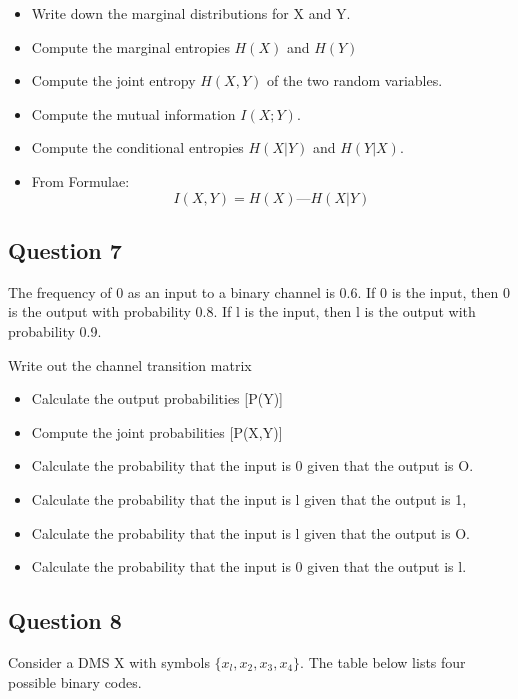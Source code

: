 \documentclass[a4paper,12pt]{article}
\begin{document}
\begin{itemize}
\item Write down the marginal distributions for X and Y. %
\item Compute the marginal entropies $H(X)$ and $H(Y)$ %
\item Compute the joint entropy $H(X,Y)$ of the two random variables. %
\item
Compute the mutual information $I(X;Y)$.
\item 
Compute the conditional entropies $H(X|Y)$ and $H(Y|X)$.
\item 
From Formulae: \[I(X,Y) = H(X) — H(X|Y)\]
\end{itemize}
\subsection*{Question 7}

The frequency of 0 as an input to a binary channel is 0.6. If 0 is the input, then 0 is the output with probability 0.8. If l is the input, then l is the output with probability 0.9.

Write out the channel transition matrix

\begin{itemize}
\item	Calculate the output probabilities [P(Y)] 
\item	Compute the joint probabilities [P(X,Y)]
\item	Calculate the probability that the input is 0 given that the output is O. 
\item Calculate the probability that the input is l given that the output is 1, 
\item	Calculate the probability that the input is l given that the output is O.
\item	Calculate the probability that the input is 0 given that the output is l. 
\end{itemize}


\subsection*{Question 8 }
Consider a DMS X with symbols $\{x_l,x_2,x_3,x_4\}$. The table below lists four possible
binary codes.
\end{document}

